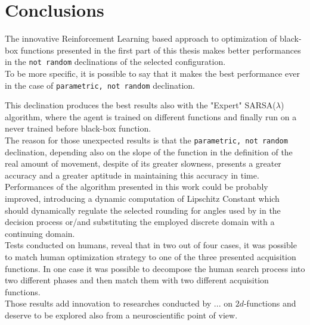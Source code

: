\chapter{Conclusions}

The innovative Reinforcement Learning based approach to optimization of black-box functions presented in the first part of this thesis makes better performances in the {\tt not random} declinations of the selected configuration. \\

To be more specific, it is possible to say that it makes the best performance ever in the case of {\tt parametric, not random} declination.

This declination produces the best results also with the "Expert" SARSA($\lambda$) algorithm, where the agent is trained on different functions and finally run on a never trained before black-box function. \\

The reason for those unexpected results is that the {\tt parametric, not random} declination, depending also on the slope of the function in the definition of the real amount of movement, despite of its greater slowness, presents a greater accuracy and a greater aptitude in maintaining this accuracy in time. \\

Performances of the algorithm presented in this work could be probably improved, introducing a dynamic computation of Lipschitz Constant which should dynamically regulate the selected rounding for angles used by in the decision process or/and substituting the employed discrete domain with a continuing domain. \\

Tests conducted on humans, reveal that in two out of four cases, it was possible to match human optimization strategy to one of the three presented acquisition functions. In one case it was possible to decompose the human search process into two different phases and then match them with two different acquisition functions. \\

Those results add innovation to researches conducted by ... on $2d$-functions and deserve to be explored also from a neuroscientific point of view. \\




